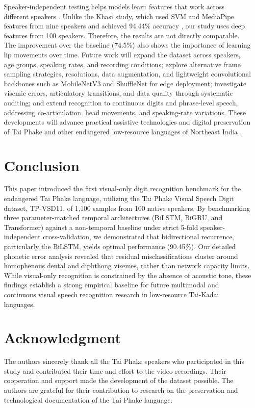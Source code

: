 \documentclass[journal]{IEEEtran}
\begin{document}
Speaker-independent testing helps models learn features that work across different speakers \cite{nemani2023speakerindependent,sheng2024visual}. Unlike the Khasi study, which used SVM and MediaPipe features from nine speakers and achieved 94.44\% accuracy \cite{lyngdoh2026khasi}, our study uses deep features from 100 speakers. Therefore, the results are not directly comparable. The improvement over the baseline (74.5\%) also shows the importance of learning lip movements over time.
Future work will expand the dataset across speakers, age groups, speaking rates, and recording conditions; explore alternative frame sampling strategies, resolutions, data augmentation, and lightweight convolutional backbones such as MobileNetV3 and ShuffleNet for edge deployment; investigate visemic errors, articulatory transitions, and data quality through systematic auditing; and extend recognition to continuous digits and phrase-level speech, addressing co-articulation, head movements, and speaking-rate variations. These developments will advance practical assistive technologies and digital preservation of Tai Phake and other endangered low-resource languages of Northeast India \cite{sheng2024visual}.

\section{Conclusion}
This paper introduced the first visual-only digit recognition benchmark for the endangered Tai Phake language, utilizing the Tai Phake Visual Speech Digit dataset, TP-VSD11, of 1,100 samples from 100 native speakers. By benchmarking three parameter-matched temporal architectures (BiLSTM, BiGRU, and Transformer) against a non-temporal baseline under strict 5-fold speaker-independent cross-validation, we demonstrated that bidirectional recurrence, particularly the BiLSTM, yields optimal performance (90.45\%). Our detailed phonetic error analysis revealed that residual misclassifications cluster around homophenous dental and diphthong visemes, rather than network capacity limits. While visual-only recognition is constrained by the absence of acoustic tone, these findings establish a strong empirical baseline for future multimodal and continuous visual speech recognition research in low-resource Tai-Kadai languages.

\section*{Acknowledgment}
The authors sincerely thank all the Tai Phake speakers who participated in this study and contributed their time and effort to the video recordings. Their cooperation and support made the development of the dataset possible. The authors are grateful for their contribution to research on the preservation and technological documentation of the Tai Phake language.



\end{document}
